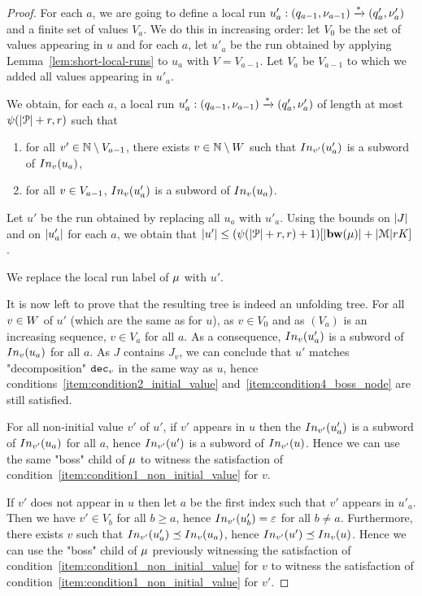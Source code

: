 \begin{proof}
	For each $a$, we are going to define a local run $u'_a : (q_{a-1}, \nu_{a-1}) \xrightarrow{*} (q'_a, \nu'_a)$ and a finite set of values $V_a$.
	We do this in increasing order: let $V_0$ be the set of values appearing in $u$ and for each $a$, let $u'_a$ be the run obtained by applying Lemma~\ref{lem:short-local-runs} to $u_a$ with $V=V_{a-1}$. Let $V_a$ be $V_{a-1}$ to which we added all values appearing in $u'_{a}$.
	
	We obtain, for each $a$, a local run $u'_a : (q_{a-1}, \nu_{a-1}) \xrightarrow{*} (q'_a, \nu'_a)$ of length at most $\psi(|\mathcal{P}|+r, r)$ such that 
	\begin{enumerate}
		\item for all $v' \in \mathbb{N} \setminus V_{a-1}$, there exists $v \in \mathbb{N} \setminus W$ such that $\vinput{\aval'}{\localrun'_a}$ is a subword of $\vinput{\aval}{\localrun_a}$,
		\item for all $v \in V_{a-1}$, $\vinput{\aval}{\localrun'_a}$ is a subword of $\vinput{\aval}{\localrun_a}$. 
	\end{enumerate}
Let $u'$ be the run obtained by replacing all $u_a$ with $u'_a$. Using the bounds on $|J|$ and on $|u'_a|$ for each $a$, we obtain that $\size{u'} \leq (\psi(\size{\prot}+r, r) +1) \Large[\size{\bosslabel{\node}}+ \size{\messages}rK\Large]$.

We replace the local run label of $\mu$ with $u'$. 


It is now left to prove that the resulting tree is indeed an unfolding tree.
	For all $v \in W$ of $u'$ (which are the same as for $u$), as $v \in V_0$ and as $(V_a)$ is an increasing sequence, $v \in V_a$ for all $a$. As a consequence, $\vinput{\aval}{\localrun'_a}$ is a subword of $\vinput{\aval}{\localrun_a}$ for all $a$. As $J$ contains $J_v$, we can conclude that $u'$ matches "decomposition" $\mathtt{dec}_v$ in the same way as $u$, hence conditions~\ref{item:condition2_initial_value} and~\ref{item:condition4_boss_node} are still satisfied.
	
	For  all non-initial value $v'$ of $u'$, if $v'$ appears in $u$ then the $\vinput{\aval'}{\localrun'_a}$ is a subword of $\vinput{\aval'}{\localrun_a}$ for all $a$, hence $\vinput{\aval'}{\localrun'}$ is a subword of $\vinput{\aval'}{\localrun}$. Hence we can use the same "boss" child of $\mu$ to witness the satisfaction of condition~\ref{item:condition1_non_initial_value} for $v$.
	
	If $v'$ does not appear in $u$ then let $a$ be the first index such that $v'$ appears in $u'_a$. Then we have $v' \in V_b$ for all $b \geq a$, hence $\vinput{v'}{u'_b} = \epsilon$ for all $b\neq a$. Furthermore, there exists $v$ such that $\vinput{v'}{u'_a} \subword \vinput{v}{u_a}$, hence $\vinput{v'}{u'} \subword \vinput{v}{u}$. Hence we can use the "boss" child of $\mu$ previously witnessing the satisfaction of condition~\ref{item:condition1_non_initial_value} for $v$ to witness the satisfaction of condition~\ref{item:condition1_non_initial_value} for $v'$.
	

\end{proof}
